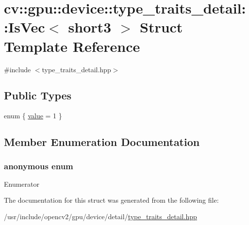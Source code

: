 \hypertarget{structcv_1_1gpu_1_1device_1_1type__traits__detail_1_1IsVec_3_01short3_01_4}{\section{cv\-:\-:gpu\-:\-:device\-:\-:type\-\_\-traits\-\_\-detail\-:\-:Is\-Vec$<$ short3 $>$ Struct Template Reference}
\label{structcv_1_1gpu_1_1device_1_1type__traits__detail_1_1IsVec_3_01short3_01_4}
}


{\ttfamily \#include $<$type\-\_\-traits\-\_\-detail.\-hpp$>$}

\subsection*{Public Types}
\begin{DoxyCompactItemize}
\item 
enum \{ \hyperlink{structcv_1_1gpu_1_1device_1_1type__traits__detail_1_1IsVec_3_01short3_01_4_a1b05bc9a2a7fdd961eaaea8d8178baeba13cf871941c0711f7b9f39bdc7f263d0}{value} = 1
 \}
\end{DoxyCompactItemize}


\subsection{Member Enumeration Documentation}
\hypertarget{structcv_1_1gpu_1_1device_1_1type__traits__detail_1_1IsVec_3_01short3_01_4_a1b05bc9a2a7fdd961eaaea8d8178baeb}{\subsubsection[{anonymous enum}]{\setlength{\rightskip}{0pt plus 5cm}anonymous enum}}\label{structcv_1_1gpu_1_1device_1_1type__traits__detail_1_1IsVec_3_01short3_01_4_a1b05bc9a2a7fdd961eaaea8d8178baeb}
\begin{Desc}
\item[Enumerator]\par
\begin{description}
\item[{\em 
\hypertarget{structcv_1_1gpu_1_1device_1_1type__traits__detail_1_1IsVec_3_01short3_01_4_a1b05bc9a2a7fdd961eaaea8d8178baeba13cf871941c0711f7b9f39bdc7f263d0}{value}\label{structcv_1_1gpu_1_1device_1_1type__traits__detail_1_1IsVec_3_01short3_01_4_a1b05bc9a2a7fdd961eaaea8d8178baeba13cf871941c0711f7b9f39bdc7f263d0}
}]\end{description}
\end{Desc}


The documentation for this struct was generated from the following file\-:\begin{DoxyCompactItemize}
\item 
/usr/include/opencv2/gpu/device/detail/\hyperlink{type__traits__detail_8hpp}{type\-\_\-traits\-\_\-detail.\-hpp}\end{DoxyCompactItemize}
